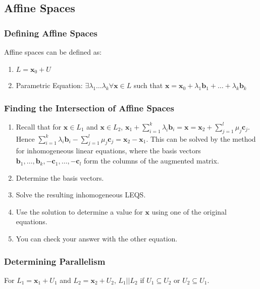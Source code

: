\documentclass[10pt,twoside,twocolumn]{article}
\begin{document}
\subsection{Affine Spaces}


\subsubsection{Defining Affine Spaces}

Affine spaces can be defined as: 
\begin{enumerate}
\item $L=\mathbf{x}_{0}+U$ 
\item Parametric Equation: $\exists\lambda_{1}\dots\lambda_{k}\forall\mathbf{x}\in L$
such that $\mathbf{x}=\mathbf{x}_{0}+\lambda_{1}\mathbf{b}_{1}+\dots+\lambda_{k}\mathbf{b}_{k}$ 
\end{enumerate}

\subsubsection{Finding the Intersection of Affine Spaces}
\begin{enumerate}
\item Recall that for $\mathbf{x}\in L_{1}$ and $\mathbf{x}\in L_{2}$,
$\mathbf{x}_{1}+\sum_{i=1}^{k}\lambda_{i}\mathbf{b}_{i}=\mathbf{x}=\mathbf{x}_{2}+\sum_{j=1}^{l}\mu_{j}\mathbf{c}_{j}$.
Hence $\sum_{i=1}^{k}\lambda_{i}\mathbf{b}_{i}-\sum_{j=1}^{l}\mu_{j}\mathbf{c}_{j}=\mathbf{x}_{2}-\mathbf{x}_{1}$.
This can be solved by the method for inhomogeneous linear equations,
where the basis vectors $\mathbf{b}_{1},\dots,\mathbf{b}_{k},-\mathbf{c}_{1},\dots,-\mathbf{c}_{l}$
form the columns of the augmented matrix. 
\item Determine the basis vectors. 
\item Solve the resulting inhomogeneous LEQS. 
\item Use the solution to determine a value for $\mathbf{x}$ using one
of the original equations. 
\item You can check your answer with the other equation. 
\end{enumerate}

\subsubsection{Determining Parallelism}

For $L_{1}=\mathbf{x}_{1}+U_{1}$ and $L_{2}=\mathbf{x}_{2}+U_{2}$,
$L_{1}||L_{2}$ if $U_{1}\subseteq U_{2}$ or $U_{2}\subseteq U_{1}$.
\end{document}
